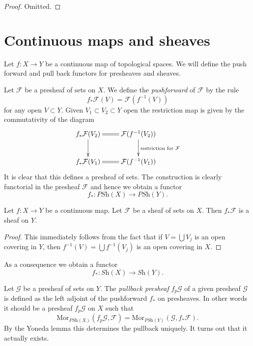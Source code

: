 \begin{proof}
Omitted.
\end{proof}




\section{Continuous maps and sheaves}
\label{section-presheaves-functorial}

\noindent
Let $f : X \to Y$ be a continuous map of topological spaces.
We will define the push forward and pull back functors for
presheaves and sheaves.

\medskip\noindent
Let $\mathcal{F}$ be a presheaf of sets on $X$. We define the
{\it pushforward} of $\mathcal{F}$ by the rule
$$
f_*\mathcal{F}(V) = \mathcal{F}(f^{-1}(V))
$$
for any open $V \subset Y$.
Given $V_1 \subset V_2 \subset Y$ open the restriction map
is given by the commutativity of the diagram
$$
\xymatrix{
f_*\mathcal{F}(V_2) \ar[d] \ar@{=}[r] &
\mathcal{F}(f^{-1}(V_2)) \ar[d]^{\text{restriction for }\mathcal{F}} \\
f_*\mathcal{F}(V_1) \ar@{=}[r] &
\mathcal{F}(f^{-1}(V_1))
}
$$
It is clear that this defines a presheaf of sets. The construction
is clearly functorial in the presheaf $\mathcal{F}$ and hence
we obtain a functor
$$
f_* : \textit{PSh}(X) \longrightarrow \textit{PSh}(Y).
$$

\begin{lemma}
\label{lemma-pushforward-sheaf}
Let $f : X \to Y$ be a continuous map.
Let $\mathcal{F}$ be a sheaf of sets on $X$.
Then $f_*\mathcal{F}$ is a sheaf on $Y$.
\end{lemma}

\begin{proof}
This immediately follows from the fact that
if $V = \bigcup V_j$ is an open covering in $Y$,
then $f^{-1}(V) = \bigcup f^{-1}(V_j)$ is an open covering in $X$.
\end{proof}

\noindent
As a consequence we obtain a functor
$$
f_* : \textit{Sh}(X) \longrightarrow \textit{Sh}(Y).
$$

\noindent
Let $\mathcal{G}$ be a presheaf of sets on $Y$.
The {\it pullback presheaf} $f_p\mathcal{G}$
of a given presheaf $\mathcal{G}$ is defined as the left adjoint
of the pushforward $f_*$ on presheaves. In other words it
should be a presheaf $f_p \mathcal{G}$ on $X$ such that
$$
\text{Mor}_{\textit{PSh}(X)}(f_p\mathcal{G}, \mathcal{F})
=
\text{Mor}_{\textit{PSh}(Y)}(\mathcal{G}, f_*\mathcal{F}).
$$
By the Yoneda lemma this determines the pullback uniquely.
It turns out that it actually exists.

